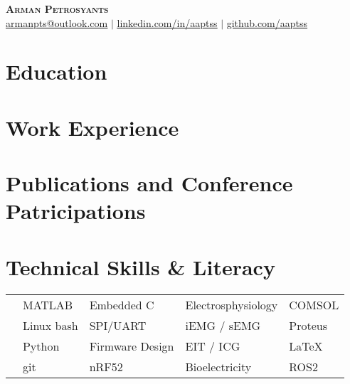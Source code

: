 \documentclass[a4paper,11pt]{article}
\newcommand{\resumeSubHeadingListStart}{\begin{itemize}[leftmargin=0.15in, label={}]}
\newcommand{\resumeSubHeadingListEnd}{\end{itemize}}
\newcommand{\DesPosition}{ }
\begin{document}
\begin{center}
    \textbf{\Huge \scshape Arman Petrosyants \DesPosition } \\ \vspace{5pt}
    \href{mailto:armanpts@outlook.com}{\underline{armanpts@outlook.com}} $|$ 
    \href{https://linkedin.com/in/aaptss}{\underline{linkedin.com/in/aaptss}} $|$
    \href{https://github.com/aaptss}{\underline{github.com/aaptss}}
\end{center}

\section{Education}
  \resumeSubHeadingListStart
	
	
  \resumeSubHeadingListEnd

\section{Work Experience}
  \resumeSubHeadingListStart
	
	
 	 
	
	
 	
   
  \resumeSubHeadingListEnd

\section{Publications and Conference Patricipations}


\section{Technical Skills \& Literacy}
%
%
\begin{tabularx}{1.0\textwidth} { 
   X L R R}
$\> \> \>$    MATLAB	            & Embedded C\     & Electrosphysiology    & COMSOL		\\
$\> \> \>$	  Linux bash	      & SPI/UART        & iEMG / sEMG           & Proteus	      \\
$\> \> \>$	  Python 			& Firmware Design & EIT / ICG             & \LaTeX         	\\
$\> \> \>$    git 			& nRF52           & Bioelectricity        & ROS2            \\
\end{tabularx}
\end{document}
